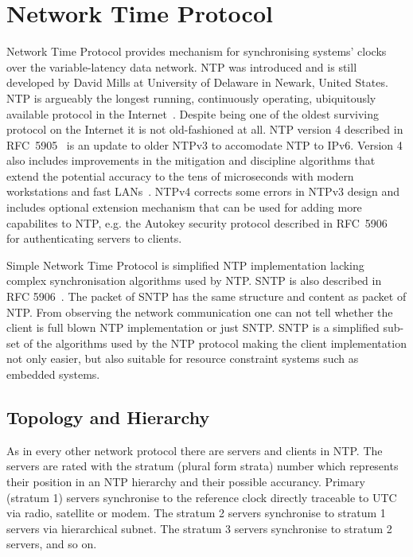 
\chapter{Network Time Protocol}
Network Time Protocol provides mechanism for synchronising systems' clocks over the variable-latency data network.
NTP was introduced and is still developed by David Mills at University of Delaware in Newark, United States.
NTP is argueably the longest running, continuously operating,
ubiquitously available protocol in the Internet~\cite{ntp-overview}.
Despite being one of the oldest surviving protocol on the Internet it is not old-fashioned at all.
NTP version 4 described in RFC~5905~\cite{rfc5905} is an update to older NTPv3 to accomodate NTP to IPv6.
Version 4 also includes improvements in
the mitigation and discipline algorithms that extend
the potential accuracy to the tens of microseconds with modern
workstations and fast LANs~\cite{rfc5905}.
NTPv4 corrects some
errors in NTPv3 design and includes optional extension mechanism
that can be used for adding more capabilites to NTP, e.g. the
Autokey security protocol described in RFC~5906~\cite{rfc5906}
for authenticating servers to clients.

Simple Network Time Protocol is simplified NTP implementation lacking complex
synchronisation algorithms used by NTP.
SNTP is also described in RFC 5906~\cite{rfc5906}.
The packet of SNTP has the same structure and content as packet of NTP.
From observing the network communication one can not tell whether the client
is full blown NTP implementation or just SNTP.
SNTP is a simplified sub-set of the algorithms used by the NTP protocol
making the client implementation not only easier, but also suitable for
resource constraint systems such as embedded systems.

\section{Topology and Hierarchy}
As in every other network protocol there are servers and clients in NTP.
The servers are rated with the stratum (plural form strata) number which represents their position
in an NTP hierarchy and their possible accurancy.
Primary (stratum 1) servers synchronise to the reference clock directly traceable to UTC via
radio, satellite or modem.
The stratum 2 servers synchronise to stratum 1
servers via hierarchical subnet.
The stratum 3 servers synchronise to stratum 2 servers, and so on.

